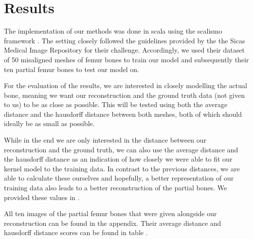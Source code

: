 \section{Results}
The implementation of our methods was done in scala using the scalismo framework . The setting closely followed the guidelines provided by the the Sicas Medical Image Repository for their  challenge. Accordingly, we used their dataset of 50 misaligned meshes of femur bones to train our model and subsequently their ten partial femur bones to test our model on. 

For the evaluation of the results, we are interested in closely modelling the actual bone, meaning we want our reconstruction and the ground truth data (not given to us) to be as close as possible. This will be tested using both the average distance and the hausdorff distance between both meshes, both of which should ideally be as small as possible.

While in the end we are only interested in the distance between our reconstruction and the ground truth, we can also use the average distance and the hausdorff distance as an indication of how closely we were able to fit our kernel model to the training data. In contrast to the previous distances, we are able to calculate these ourselves and hopefully, a better representation of our training data also leads to a better reconstruction of the partial bones. We provided these values in .

All ten images of the partial femur bones that were given alongside our reconstruction can be found in the appendix. Their average distance and hausdorff distance scores can be found in table  .